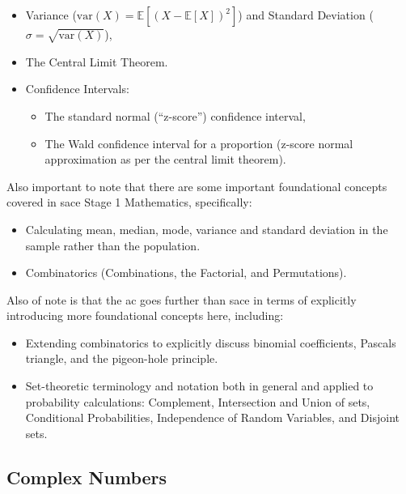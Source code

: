 \documentclass[twoside,12pt,a4paper]{report}
\begin{document}
\begin{itemize}
	\item Variance ($\text{var}(X) = \mathbb{E}\left[(X - \mathbb{E}[X])^2\right]$) and Standard Deviation ($\sigma = \sqrt{\text{var}(X)}$), 
	\item The Central Limit Theorem.
	\item Confidence Intervals: 
		\begin{itemize}
			\item The standard normal (``z-score'') confidence interval,
			\item The Wald confidence interval for a proportion (z-score normal approximation as per the central limit theorem).
		\end{itemize}
\end{itemize}

Also important to note that there are some important foundational concepts covered in \gls{sace} Stage 1 Mathematics, specifically:
\begin{itemize}
	\item Calculating mean, median, mode, variance and standard deviation in the sample rather than the population.
	\item Combinatorics (Combinations, the Factorial, and Permutations).
\end{itemize}

Also of note is that the \gls{ac} goes further than \gls{sace} in terms of explicitly introducing more foundational concepts here, including: 
\begin{itemize}
	\item Extending combinatorics to explicitly discuss binomial coefficients, Pascals triangle, and the pigeon-hole principle.
	\item Set-theoretic terminology and notation both in general and applied to probability calculations: Complement, Intersection and Union of sets, Conditional Probabilities, Independence of Random Variables, and Disjoint sets.
\end{itemize}

\subsection{Complex Numbers}
\end{document}
